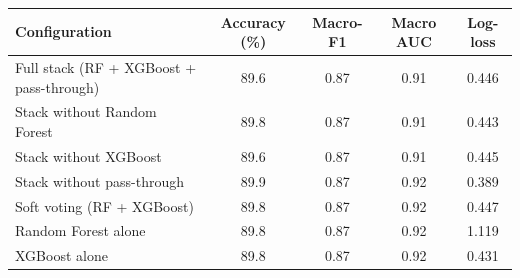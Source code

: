 \begin{tabular}{@{}lcccc@{}}
\toprule
Configuration & Accuracy (\%) & Macro-F1 & Macro AUC & Log-loss\\
\midrule
Full stack (RF + XGBoost + pass-through) & 89.6 & 0.87 & 0.91 & 0.446\\
Stack without Random Forest & 89.8 & 0.87 & 0.91 & 0.443\\
Stack without XGBoost & 89.6 & 0.87 & 0.91 & 0.445\\
Stack without pass-through & 89.9 & 0.87 & 0.92 & 0.389\\
Soft voting (RF + XGBoost) & 89.8 & 0.87 & 0.92 & 0.447\\
Random Forest alone & 89.8 & 0.87 & 0.92 & 1.119\\
XGBoost alone & 89.8 & 0.87 & 0.92 & 0.431\\
\bottomrule
\end{tabular}